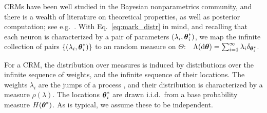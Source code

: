 CRMs have been well studied in the Bayesian nonparametrics community, and there is a wealth of literature on
theoretical properties, as well as posterior computation; see e.g.\ \citep{JamesLP09, Hjo1990, ThiJor2007}. 
With Eq.~\eqref{eq:mark_distr} in mind, and recalling that each neuron is characterized by a pair of parameters $(\lambda_i, \boldsymbol{\theta}^*_i)$,
we map the infinite collection of pairs $\{(\lambda_i, \boldsymbol{\theta}^*_i)\}$ to an random measure on $\Theta$:
$\ \  \Lambda(\mathrm{d} \boldsymbol{\theta}) = \sum_{i=1}^{\infty} \lambda_i \delta_{\boldsymbol{\theta}^*_i}$.

For a CRM, the distribution over measures is induced by distributions
over the infinite sequence of weights, and the infinite sequence of their locations. 
The weights $\lambda_i$ are the jumps of a \Levy process \citep{Sato90}, and their distribution is characterized by a 
\Levy measure $\rho(\lambda)$. The locations $\boldsymbol{\theta}^*_i$ are drawn i.i.d.\  from a base probability measure $H(\boldsymbol{\theta}^*)$.
As is typical, we assume these to be independent. %

